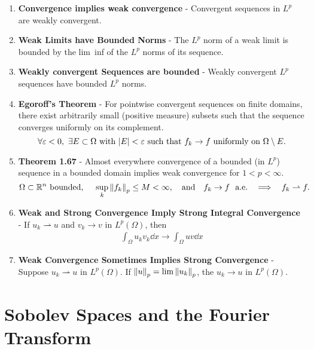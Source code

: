 \documentclass{article}
\newcommand{\E}{\varepsilon}
\begin{document}
\begin{enumerate}
        \item \textbf{Convergence implies weak convergence} - Convergent sequences in $L^p$ are weakly convergent.
        \item \textbf{Weak Limits have Bounded Norms} - The $L^p$ norm of a weak limit is bounded by the lim~inf of the $L^p$ norms of its sequence.
        \item \textbf{Weakly convergent Sequences are bounded} - Weakly convergent $L^p$ sequences have bounded $L^p$ norms.
        \item \textbf{Egoroff's Theorem} - For pointwise convergent sequences on finite domains, there exist arbitrarily small (positive measure) subsets such that the sequence converges uniformly on its complement. $$\forall \E < 0,\ \exists E \subset \Omega\ \text{with}\ \abs{E} < \E\ \text{such that}\ f_k \rightarrow f\ \text{uniformly on}\ \Omega\setminus E.$$
        \item \textbf{Theorem 1.67} - Almost everywhere convergence of a bounded (in $L^p$) sequence in a bounded domain implies weak convergence for $1 < p < \infty$. $$\Omega \subset \mathbb{R}^n\ \text{bounded},\ \ \ \ \sup_{k}\norm{f_k}_p \leq M < \infty,\ \ \ \text{and}\ \ \ f_k \rightarrow f\ \text{ a.e.}\ \ \implies\ \ f_k \rightharpoonup f.$$
        \item \textbf{Weak and Strong Convergence Imply Strong Integral Convergence} - If $u_k \rightharpoonup u$ and $v_k \rightarrow v$ in $L^p(\Omega)$, then
        \begin{align*}
            \int_\Omega u_kv_k \dd x \rightarrow \int_\Omega uv \dd x
        \end{align*}
        \item \textbf{Weak Convergence Sometimes Implies Strong Convergence} - Suppose $u_k \rightharpoonup u$ in $L^p(\Omega)$.  If $\norm{u}_p = \lim\norm{u_k}_p$, the $u_k \rightarrow u$ in $L^p(\Omega)$.
    \end{enumerate}

    \section{Sobolev Spaces and the Fourier Transform}
\end{document}
